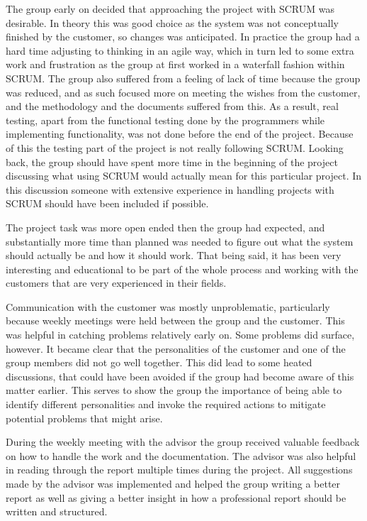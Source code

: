 \documentclass[11pt]{book}
\begin{document}
The group early on decided that approaching the project with SCRUM was desirable. In theory this was good choice as the system was not conceptually finished by the customer, so changes was anticipated. In practice the group had a hard time adjusting to thinking in an agile way, which in turn led to some extra work and frustration as the group at first worked in a waterfall fashion within SCRUM. The group also suffered from a feeling of lack of time because the group was reduced, and as such focused more on meeting the wishes from the customer, and the methodology and the documents suffered from this. As a result, real testing, apart from the functional testing done by the programmers while implementing functionality, was not done before the end of the project. Because of this the testing part of the project is not really following SCRUM. Looking back, the group should have spent more time in the beginning of the project discussing what using SCRUM would actually mean for this particular project. In this discussion someone with extensive experience in handling projects with SCRUM should have been included if possible.

The project task was more open ended then the group had expected, and substantially more time than planned was needed to figure out what the system should actually be and how it should work. That being said, it has been very interesting and educational to be part of the whole process and working with the customers that are very experienced in their fields.

Communication with the customer was mostly unproblematic, particularly because weekly meetings were held between the group and the customer. This was helpful in catching problems relatively early on. Some problems did surface, however. It became clear that the personalities of the customer and one of the group members did not go well together. This did lead to some heated discussions, that could have been avoided if the group had become aware of this matter earlier. This serves to show the group the importance of being able to identify different personalities and invoke the required actions to mitigate potential problems that might arise.

During the weekly meeting with the advisor the group received valuable feedback on how to handle the work and the documentation. The advisor was also helpful in reading through the report multiple times during the project. All suggestions made by the advisor was implemented and helped the group writing a better report as well as giving a better insight in how a professional report should be written and structured.
\end{document}
